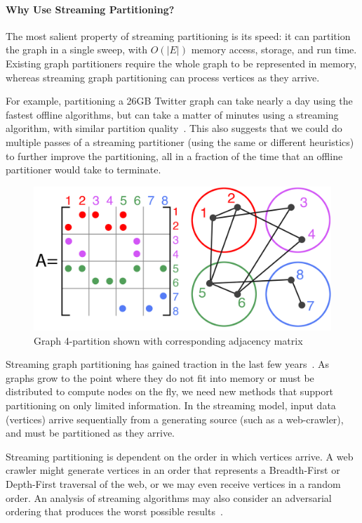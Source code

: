 \paragraph{Why Use Streaming Partitioning?}
The most salient property of streaming partitioning is its speed: it can partition the graph in a single sweep, with $O(|E|)$ memory access, storage, and run time. Existing graph partitioners require the whole graph to be represented in memory, whereas streaming graph partitioning can process vertices as they arrive.

For example, partitioning a 26GB Twitter graph can take nearly a day using the fastest offline algorithms, but can take a matter of minutes using a streaming algorithm, with similar partition quality~\cite{tsourakakis2012fennel}.
This also suggests that we could do multiple passes of a streaming partitioner (using the same or different heuristics) to further improve the partitioning, all in a fraction of the time that an offline partitioner would take to terminate.


\begin{figure}[h]
\centering
\includegraphics[width=0.85\columnwidth] {figures/graphpart1.png}
\caption[Caption for]{Graph 4-partition shown with corresponding adjacency matrix}
\label{fig:0}
\end{figure}


Streaming graph partitioning has gained traction in the last few years~\cite{DBLP:journals/corr/abs-1212-1121,Stanton:2012:SGP:2339530.2339722,tsourakakis2012fennel}.
As graphs grow to the point where they do not fit into memory or must be distributed to compute nodes on the fly, we need new methods that support partitioning on only limited information.
In the streaming model, input data (vertices) arrive sequentially from a generating source (such as a web-crawler), and must be partitioned as they arrive.

Streaming partitioning is dependent on the order in which vertices arrive.
A web crawler might generate vertices in an order that represents a Breadth-First or Depth-First traversal of the web, or we may even receive vertices in a random order.
An analysis of streaming algorithms may also consider an adversarial ordering that produces the worst possible results~\cite{Stanton:2012:SGP:2339530.2339722}.

